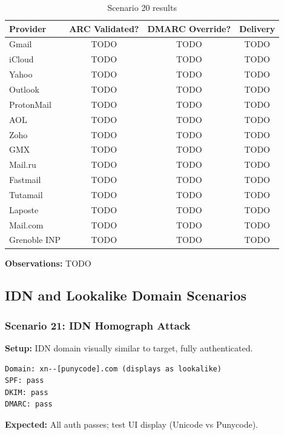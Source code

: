 \documentclass[11pt,a4paper]{article}
\begin{document}
\begin{table}[h]
\centering
\small
\begin{tabular}{lccc}
\toprule
\textbf{Provider} & \textbf{ARC Validated?} & \textbf{DMARC Override?} & \textbf{Delivery} \\
\midrule
Gmail & TODO & TODO & TODO \\
iCloud & TODO & TODO & TODO \\
Yahoo & TODO & TODO & TODO \\
Outlook & TODO & TODO & TODO \\
ProtonMail & TODO & TODO & TODO \\
AOL & TODO & TODO & TODO \\
Zoho & TODO & TODO & TODO \\
GMX & TODO & TODO & TODO \\
Mail.ru & TODO & TODO & TODO \\
Fastmail & TODO & TODO & TODO \\
Tutamail & TODO & TODO & TODO \\
Laposte & TODO & TODO & TODO \\
Mail.com & TODO & TODO & TODO \\
Grenoble INP & TODO & TODO & TODO \\
\bottomrule
\end{tabular}
\caption{Scenario 20 results}
\end{table}

\textbf{Observations:} TODO

\subsection{IDN and Lookalike Domain Scenarios}

\subsubsection{Scenario 21: IDN Homograph Attack}

\textbf{Setup:} IDN domain visually similar to target, fully authenticated.

\begin{lstlisting}
Domain: xn--[punycode].com (displays as lookalike)
SPF: pass
DKIM: pass
DMARC: pass
\end{lstlisting}

\textbf{Expected:} All auth passes; test UI display (Unicode vs Punycode).
\end{document}
